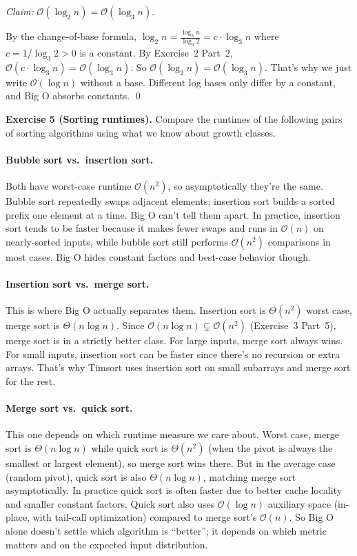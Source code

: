 \documentclass{article}
\theoremstyle{theorem}
\theoremstyle{definition}
\theoremstyle{remark}
\begin{document}
\emph{Claim:} $\mathcal{O}(\log_2 n) = \mathcal{O}(\log_3 n)$.

By the change-of-base formula, $\log_2 n = \frac{\log_3 n}{\log_3 2} = c \cdot \log_3 n$ where $c = 1/\log_3 2 > 0$ is a constant. By Exercise~2 Part~2, $\mathcal{O}(c \cdot \log_3 n) = \mathcal{O}(\log_3 n)$. So $\mathcal{O}(\log_2 n) = \mathcal{O}(\log_3 n)$. That's why we just write $\mathcal{O}(\log n)$ without a base. Different log bases only differ by a constant, and Big O absorbs constants. \qed

\bigskip

\textbf{Exercise 5 (Sorting runtimes).}
Compare the runtimes of the following pairs of sorting algorithms using what we know about growth classes.

\paragraph{Bubble sort vs.\ insertion sort.}

Both have worst-case runtime $\mathcal{O}(n^2)$, so asymptotically they're the same. Bubble sort repeatedly swaps adjacent elements; insertion sort builds a sorted prefix one element at a time. Big O can't tell them apart. In practice, insertion sort tends to be faster because it makes fewer swaps and runs in $\mathcal{O}(n)$ on nearly-sorted inputs, while bubble sort still performs $\mathcal{O}(n^2)$ comparisons in most cases. Big O hides constant factors and best-case behavior though.

\paragraph{Insertion sort vs.\ merge sort.}

This is where Big O actually separates them. Insertion sort is $\Theta(n^2)$ worst case, merge sort is $\Theta(n \log n)$. Since $\mathcal{O}(n \log n) \subsetneq \mathcal{O}(n^2)$ (Exercise~3 Part~5), merge sort is in a strictly better class. For large inputs, merge sort always wins. For small inputs, insertion sort can be faster since there's no recursion or extra arrays. That's why Timsort uses insertion sort on small subarrays and merge sort for the rest.

\paragraph{Merge sort vs.\ quick sort.}

This one depends on which runtime measure we care about. Worst case, merge sort is $\Theta(n \log n)$ while quick sort is $\Theta(n^2)$ (when the pivot is always the smallest or largest element), so merge sort wins there. But in the average case (random pivot), quick sort is also $\Theta(n \log n)$, matching merge sort asymptotically. In practice quick sort is often faster due to better cache locality and smaller constant factors. Quick sort also uses $\mathcal{O}(\log n)$ auxiliary space (in-place, with tail-call optimization) compared to merge sort's $\mathcal{O}(n)$. So Big O alone doesn't settle which algorithm is ``better''; it depends on which metric matters and on the expected input distribution.
\end{document}
